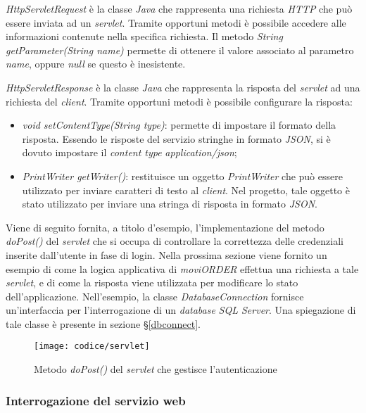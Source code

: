 \textit{HttpServletRequest} è la classe \textit{Java} che rappresenta una richiesta \textit{HTTP} che può essere inviata ad un \textit{servlet}. Tramite opportuni metodi è possibile accedere alle informazioni contenute nella specifica richiesta. Il metodo \textit{String getParameter(String name)} permette di ottenere il valore associato al parametro \textit{name}, oppure \textit{null} se questo è inesistente.

\textit{HttpServletResponse} è la classe \textit{Java} che rappresenta la risposta del \textit{servlet} ad una richiesta del \textit{client}. Tramite opportuni metodi è possibile configurare la risposta:
\begin{itemize}
	\item \textit{void setContentType(String type)}: permette di impostare il formato della risposta. Essendo le risposte del servizio stringhe in formato \textit{JSON}, si è dovuto impostare il \textit{content type} \textit{application/json};
	\item \textit{PrintWriter getWriter()}: restituisce un oggetto \textit{PrintWriter} che può essere utilizzato per inviare caratteri di testo al \textit{client}. Nel progetto, tale oggetto è stato utilizzato per inviare una stringa di risposta in formato \textit{JSON}.
\end{itemize}

Viene di seguito fornita, a titolo d'esempio, l'implementazione del metodo \textit{doPost()} del \textit{servlet} che si occupa di controllare la correttezza delle credenziali inserite dall'utente in fase di login. Nella prossima sezione viene fornito un esempio di come la logica applicativa di \textit{moviORDER} effettua una richiesta a tale \textit{servlet}, e di come la risposta viene utilizzata per modificare lo stato dell'applicazione. Nell'esempio, la classe \textit{DatabaseConnection} fornisce un'interfaccia per l'interrogazione di un \textit{database} \textit{SQL Server}. Una spiegazione di tale classe è presente in sezione §\ref{dbconnect}.

\begin{figure}[!h] 
    \centering 
    \texttt{[image: codice/servlet]} 
    \caption{Metodo \textit{doPost()} del \textit{servlet} che gestisce l'autenticazione}
\end{figure}
\subsubsection{Interrogazione del servizio web}

